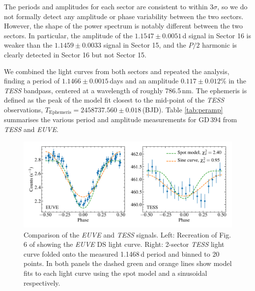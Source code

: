 \documentclass{aastex63}
\begin{document}
The periods and amplitudes for each sector are consistent to within 3$\sigma$, so we do not formally detect any amplitude or phase variability between the two sectors. However, the shape of the power spectrum is notably different between the two sectors. In particular, the amplitude of the $1.1547\pm0.0051$\,d signal in Sector 16 is weaker than the $1.1459\pm0.0033$ signal in Sector 15, and the $P/2$ harmonic is clearly detected in Sector 16 but not Sector 15.  

We combined the light curves from both sectors and repeated the analysis, finding a period of $1.1466\pm0.0015$\,days and an amplitude $0.117\pm0.012$\% in the {\em TESS} bandpass, centered at a wavelength of roughly 786.5\,nm. The ephemeris is defined as the peak of the model fit closest to the mid-point of the \textit{TESS} observations, $T_{\mathrm{Ephemeris}} =2458737.560\pm0.018$\,(BJD). Table \ref{tab:peramp} summarises the various period and amplitude measurements for GD\,394 from \textit{TESS} and \textit{EUVE}. 





\begin{figure}
    \centering
    \includegraphics[width=\columnwidth]{euve_v_tess_mod_sin.pdf}
    \caption{Comparison of the \textit{EUVE} and \textit{TESS} signals. Left: Recreation of Fig. 6 of \citet{dupuisetal00-1} showing the \textit{EUVE} DS light curve. Right: 2-sector \textit{TESS} light curve folded onto the measured 1.1468\,d period and binned to 20 points. In both panels the dashed green and orange lines show model fits to each light curve using the \citet{dupuisetal00-1} spot model and a sinusoidal respectively.}
    \label{fig:euve}
\end{figure}
\end{document}
